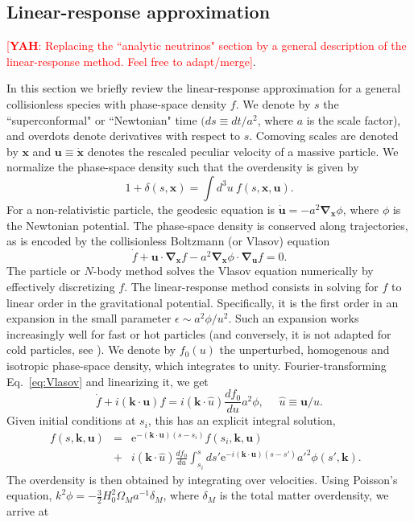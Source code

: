 \documentclass[useAMS, usenatbib]{mnras}
\newcommand{\beq}{\begin{equation}}
\newcommand{\eeq}{\end{equation}}
\newcommand{\barr}{\begin{eqnarray}}
\newcommand{\earr}{\end{eqnarray}}
\newcommand{\rme}{\textrm{e}}
\newcommand{\bs}{\mathbf}
\newcommand{\yah}[1]{{\textcolor{red}{[{\bf YAH}: #1]}}}
\begin{document}
\subsection{Linear-response approximation} \label{sec:analytic}

\yah{Replacing the ``analytic neutrinos" section by a general description of the linear-response method. Feel free to adapt/merge}.


In this section we briefly review the linear-response approximation for a general collisionless species with phase-space density $f$. We denote by $s$ the ``superconformal" or ``Newtonian" time $(ds \equiv dt/a^2$, where $a$ is the scale factor), and overdots denote derivatives with respect to $s$. Comoving scales are denoted by $\bs{x}$ and $\bs{u} \equiv \dot{\bs{x}}$ denotes the rescaled peculiar velocity of a massive particle. We normalize the phase-space density such that the overdensity is given by
\beq
1 + \delta(s, \bs{x}) = \int d^3 u ~ f(s, \bs{x}, \bs{u}).
\eeq
For a non-relativistic particle, the geodesic equation is $\dot{\bs{u}} = - a^2  \bs{\nabla}_{\bs{x}} \phi$, where $\phi$ is the Newtonian potential. The phase-space density is conserved along trajectories, as is encoded by the collisionless Boltzmann (or Vlasov) equation
\beq
\dot{f} + \bs{u} \cdot \bs{\nabla}_{\bs{x}} f - a^2 \bs{\nabla}_{\bs{x}} \phi \cdot \bs{\nabla}_{\bs{u}} f = 0. \label{eq:Vlasov}
\eeq
The particle or $N$-body method solves the Vlasov equation numerically by effectively discretizing $f$. The linear-response method consists in solving for $f$ to linear order in the gravitational potential. Specifically, it is the first order in an expansion in the small parameter $\epsilon \sim a^2 \phi/u^2$. Such an expansion works increasingly well for fast or hot particles (and conversely, it is not adapted for cold particles, see \citealt{YAH_15}). We denote by $f_0(u)$ the unperturbed, homogenous and isotropic phase-space density, which integrates to unity. Fourier-transforming Eq.~\eqref{eq:Vlasov} and linearizing it, we get
\beq
\dot{f} + i (\bs{k} \cdot \bs{u}) f = i (\bs{k} \cdot  \hat{u}) \frac{d f_0}{du} a^2 \phi ,  \ \ \ \ \ \ \hat{u} \equiv \bs{u}/u.
\eeq
Given initial conditions at $s_i$, this has an explicit integral solution,
\barr
f(s, \bs{k}, \bs{u}) &=& \rme^{- (\bs{k} \cdot \bs{u}) (s - s_i)} f(s_i, \bs{k}, \bs{u}) \nonumber\\
&+& i (\bs{k} \cdot  \hat{u}) \frac{d f_0}{du} \int_{s_i}^s d s' \rme^{- i(\bs{k} \cdot \bs{u}) (s - s')} a'^2 \phi(s', \bs{k}).~~~
\earr
The overdensity is then obtained by integrating over velocities. Using Poisson's equation, $k^2 \phi = - \frac32 H_0^2 \Omega_M a^{-1} \delta_M$, where $\delta_M$ is the total matter overdensity, we arrive at
\end{document}
